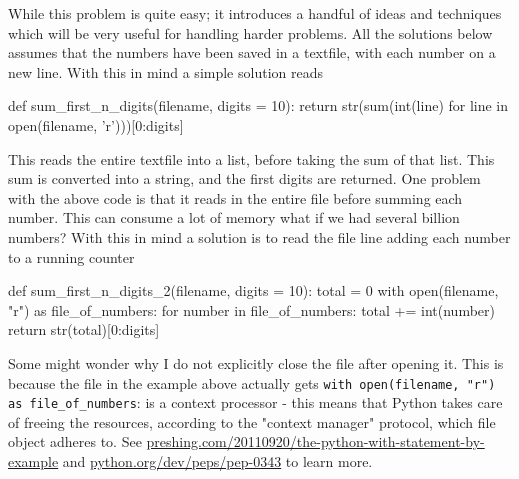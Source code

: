 While this problem is quite easy; it introduces a handful of ideas and techniques which will be very useful for handling harder problems.
All the solutions below assumes that the numbers have been saved in a textfile, with each number on a new line. With this in mind a simple solution reads
%
\begin{pythoncode}
	def sum_first_n_digits(filename, digits = 10):
    	return str(sum(int(line) for line in open(filename, 'r')))[0:digits]
\end{pythoncode}
%
This reads the entire textfile into a list, before taking the sum of that list. This sum is converted into a string, and the first digits are returned. 
One problem with the above code is that it reads in the entire file before summing each number. This can consume a lot of memory what if we had several billion numbers? 
With this in mind a solution is to read the file line adding each number to a running counter
%
\begin{pythoncode}
	def sum_first_n_digits_2(filename, digits = 10):
	    total = 0
	    with open(filename, "r") as file_of_numbers:
	        for number in file_of_numbers:
	            total += int(number)
	    return str(total)[0:digits]
\end{pythoncode}
%
Some might wonder why I do not explicitly close the file after opening it. This is because the file in the example above actually gets \verb|with open(filename, "r") as file_of_numbers|: is a context processor - this means that Python takes care of freeing the resources, according to the "context manager" protocol, which file object adheres to. See \url{preshing.com/20110920/the-python-with-statement-by-example} and \url{python.org/dev/peps/pep-0343} to learn more.

